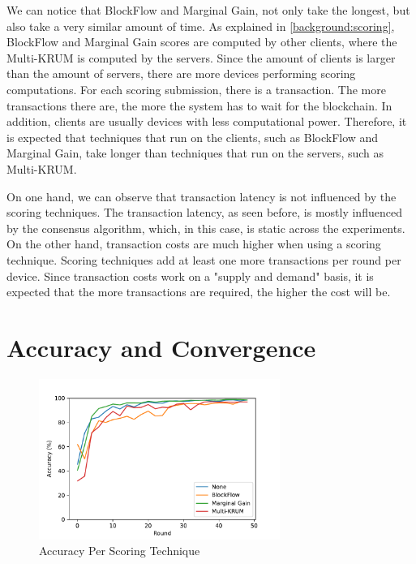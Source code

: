 We can notice that BlockFlow and Marginal Gain, not only take the longest, but also take a very similar amount of time. As explained in \autoref{background:scoring}, BlockFlow and Marginal Gain scores are computed by other clients, where the Multi-KRUM is computed by the servers. Since the amount of clients is larger than the amount of servers, there are more devices performing scoring computations. For each scoring submission, there is a transaction. The more transactions there are, the more the system has to wait for the blockchain. In addition, clients are usually devices with less computational power. Therefore, it is expected that techniques that run on the clients, such as BlockFlow and Marginal Gain, take longer than techniques that run on the servers, such as Multi-KRUM.

On one hand, we can observe that transaction latency is not influenced by the scoring techniques. The transaction latency, as seen before, is mostly influenced by the consensus algorithm, which, in this case, is static across the experiments. On the other hand, transaction costs are much higher when using a scoring technique. Scoring techniques add at least one more transactions per round per device. Since transaction costs work on a "supply and demand" basis, it is expected that the more transactions are required, the higher the cost will be.

\section{Accuracy and Convergence}

\begin{figure}[!ht]
    \centering
    \centering
    \includegraphics[width=0.7\textwidth]{graphics/04_scoring_accuracy.pdf}
    \caption{Accuracy Per Scoring Technique}
    \label{fig:accuracy_scoring}
\end{figure}


